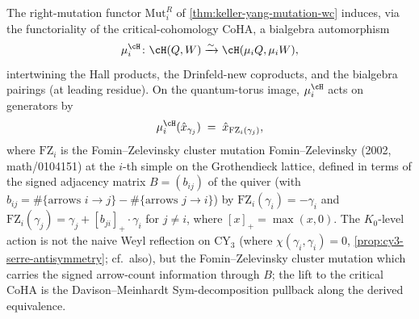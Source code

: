 \begin{theorem}
 \label{thm:mutation-bialgebra-automorphism}
 The right-mutation functor $\mathrm{Mut}_i^R$ of
 \cref{thm:keller-yang-mutation-wc} induces, via the functoriality of the
 critical-cohomology CoHA, a bialgebra automorphism
 \[
 \mu_i^\cH \colon \cH(Q, W) \xrightarrow{\sim} \cH(\mu_i Q, \mu_i W),
 \]
 intertwining the Hall products, the Drinfeld-new coproducts, and the
 bialgebra pairings (at leading residue). On the quantum-torus image,
 $\mu_i^\cH$ acts on generators by
 \[
 \mu_i^\cH(\hat{x}_{\gamma_j}) \;=\; \hat{x}_{\mathrm{FZ}_i(\gamma_j)},
 \]
 where $\mathrm{FZ}_i$ is the Fomin--Zelevinsky cluster mutation
 Fomin--Zelevinsky (2002, math/0104151) at the $i$-th simple on the
 Grothendieck lattice, defined in terms of the signed adjacency matrix
 $B = (b_{ij})$ of the quiver (with $b_{ij} = \#\{\text{arrows } i \to j\} - \#\{\text{arrows } j \to i\}$)
 by $\mathrm{FZ}_i(\gamma_i) = -\gamma_i$ and
 $\mathrm{FZ}_i(\gamma_j) = \gamma_j + [b_{ji}]_+ \cdot \gamma_i$
 for $j \neq i$, where $[x]_+ = \max(x, 0)$. The $K_0$-level action is
 not the naive Weyl reflection on CY$_3$ (where
 $\chi(\gamma_i, \gamma_i) = 0$, \cref{prop:cy3-serre-antisymmetry};
 cf.~also), but the Fomin--Zelevinsky cluster mutation which
 carries the signed arrow-count information through $B$; the lift to
 the critical CoHA is the Davison--Meinhardt Sym-decomposition pullback
 along the derived equivalence.
\end{theorem}

